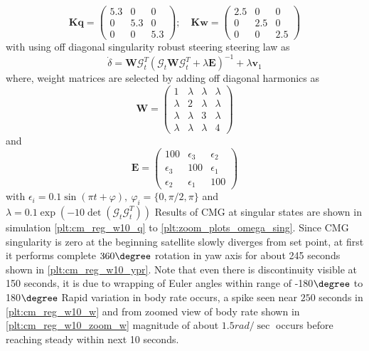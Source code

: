 \begin{equation}
\mathbf{Kq} =\begin{pmatrix}
5.3 & 0 & 0\\
0 & 5.3 & 0\\
0 & 0 & 5.3
\end{pmatrix} ;\quad \mathbf{Kw} =\begin{pmatrix}
2.5 & 0 & 0\\
0 & 2.5 & 0\\
0 & 0 & 2.5
\end{pmatrix}
\end{equation}
with using off diagonal singularity robust steering steering law as
\begin{equation}
\dot{\delta } =\mathbf{W}\mathcal{G}^{T}_{t}\left(\mathcal{G}_{t}\mathbf{W}\mathcal{G}^{T}_{t} +\lambda \mathbf{E}\right)^{-1} +\lambda \mathbf{v}_{1}
\end{equation}
where, weight matrices are selected by adding off diagonal harmonics as
\begin{equation*}
\mathbf{W} =\begin{pmatrix}
1 & \lambda  & \lambda  & \lambda \\
\lambda  & 2 & \lambda  & \lambda \\
\lambda  & \lambda  & 3 & \lambda \\
\lambda  & \lambda  & \lambda  & 4
\end{pmatrix}
\end{equation*}and
\begin{equation*}
\mathbf{E} =\begin{pmatrix}
100 & \epsilon _{3} & \epsilon _{2}\\
\epsilon _{3} & 100 & \epsilon _{1}\\
\epsilon _{2} & \epsilon _{1} & 100
\end{pmatrix}
\end{equation*}
with $ \epsilon _{i} =0.1\sin( \pi t+\varphi ) ,\ \varphi _{i} =\{0,\pi /2,\pi \}$ and $ \lambda =0.1\exp\left( -10\det\left(\mathcal{G}_{t}\mathcal{G}^{T}_{t}\right)\right)$ 
Results of CMG at singular states are shown in simulation \autoref{plt:cm_reg_w10_q} to \autoref{plt:zoom_plots_omega_sing}. Since CMG singularity is zero at the beginning satellite slowly diverges from set point, at first it performs complete $360 \degree$ rotation in yaw axis for about 245 seconds shown in \autoref{plt:cm_reg_w10_ypr}. Note that even there is discontinuity visible at 150 seconds, it is due to wrapping of Euler angles within range of -180$\degree$ to 180$\degree$ Rapid variation in body rate occurs, a spike seen near $250$ seconds in \autoref{plt:cm_reg_w10_w} and from zoomed view of body rate shown in \autoref{plt:cm_reg_w10_zoom_w} magnitude of about $1.5 rad/\sec$ occurs before reaching steady within next 10 seconds.
